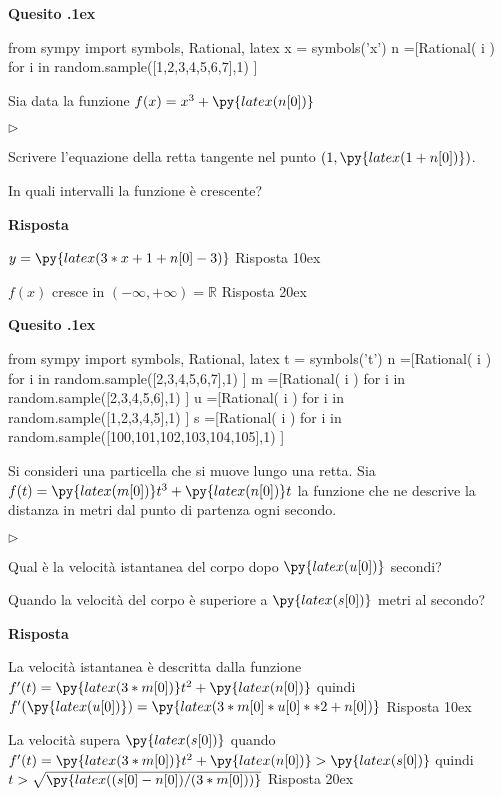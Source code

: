 \documentclass[11pt,twoside,a4paper]{article}
\newcommand{\mylabel}[1]{#1\hfill}
\renewenvironment{itemize}
  {\begin{list}{$\triangleright$}{%
   \setlength{\parskip}{0mm}
   \setlength{\topsep}{.4\baselineskip}
   \setlength{\rightmargin}{0mm}
   \setlength{\listparindent}{0mm}
   \setlength{\itemindent}{0mm}
   \setlength{\labelwidth}{2ex}
   \setlength{\itemsep}{.4\baselineskip}
   \setlength{\parsep}{0mm}
   \setlength{\partopsep}{0mm}
   \setlength{\labelsep}{1ex}
   \setlength{\leftmargin}{\labelwidth+\labelsep}
   \let\makelabel\mylabel}}{%
   \end{list}\vspace*{-1.3mm}}
\newcounter{quesito}
\newenvironment{question}{\bigskip\addtocounter{quesito}{1}\bigskip\bigskip\par\textbf{Quesito \thequesito.\kern1ex}}{\vspace{\parskip}}
\newenvironment{xquestion}{\bigskip\addtocounter{quesito}{1}\bigskip\bigskip\par\textbf{Quesito \thequesito.\kern1ex}}{\vspace{\parskip}}
\newenvironment{answer}{\par\textbf{Risposta\quad}}{\vspace{\parskip}}
\begin{document}
\begin{question}
\def\RR{{\mathds R}}
\begin{pycode}
from sympy import symbols, Rational, latex
x = symbols('x')
n =[Rational( i ) for i in random.sample([1,2,3,4,5,6,7],1) ]
\end{pycode}
Sia data la funzione $f(x) = x^3 + \py{latex(n[0])}$
\begin{itemize}
\item[1.] Scrivere l'equazione della retta tangente nel punto $(1, \py{latex(1+n[0])})$.
\item[2.] In quali intervalli la funzione è crescente?
\end{itemize}
\begin{answer}

{\color{blue}
$y = \py{latex(3*x+1+n[0]-3)}$
\hfill Risposta 1\kern0ex}

{\color{blue}
$f(x)$ cresce in $(-\infty,+\infty) = \RR$
\hfill Risposta 2\kern0ex}

\end{answer}
\end{question}
\begin{xquestion}
\begin{pycode}
from sympy import symbols, Rational, latex
t = symbols('t')
n =[Rational( i ) for i in random.sample([2,3,4,5,6,7],1) ]
m =[Rational( i ) for i in random.sample([2,3,4,5,6],1) ]
u =[Rational( i ) for i in random.sample([1,2,3,4,5],1) ]
s =[Rational( i ) for i in random.sample([100,101,102,103,104,105],1) ]
\end{pycode}
Si consideri una particella che si muove lungo una retta. Sia $f(t) = \py{latex(m[0])} t^3 + \py{latex(n[0])} t$ la funzione che ne descrive la distanza in metri dal punto di partenza ogni secondo.
\begin{itemize}
\item[1.] Qual è la velocità istantanea del corpo dopo $\py{latex(u[0])}$ secondi?
\item[2.] Quando la velocità del corpo è superiore a $\py{latex(s[0])}$ metri al secondo?
\end{itemize}
\begin{answer}

La velocità istantanea è descritta dalla funzione $f'(t) = \py{latex(3*m[0])} t^2 + \py{latex(n[0])}$ quindi
{\color{blue}
$f'(\py{latex(u[0])}) = \py{latex(3*m[0]*u[0]**2+n[0])}$
\hfill Risposta 1\kern0ex}

La velocità supera $\py{latex(s[0])}$ quando $f'(t) = \py{latex(3*m[0])} t^2 + \py{latex(n[0])} > \py{latex(s[0])}$ quindi
{\color{blue}
$t > \sqrt{\displaystyle\py{latex((s[0]-n[0])/(3*m[0]))}}$
\hfill Risposta 2\kern0ex}

\end{answer}
\end{xquestion}
\end{document}
